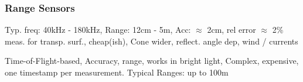 \subsubsection{Range Sensors}
 Typ. freq: 40kHz - 180kHz, Range: 12cm - 5m, Acc: $\approx$ 2cm, rel error $\approx$ 2\%
{\color{ForestGreen} meas. for transp. surf., cheap(ish)}, {\color{red} Cone wider, reflect. angle dep, wind / currents}

 Time-of-Flight-based, {\color{ForestGreen}Accuracy, range, works in bright light}, {\color{red} Complex, expensive, one timestamp per measurement}.
Typical Ranges: up to 100m
